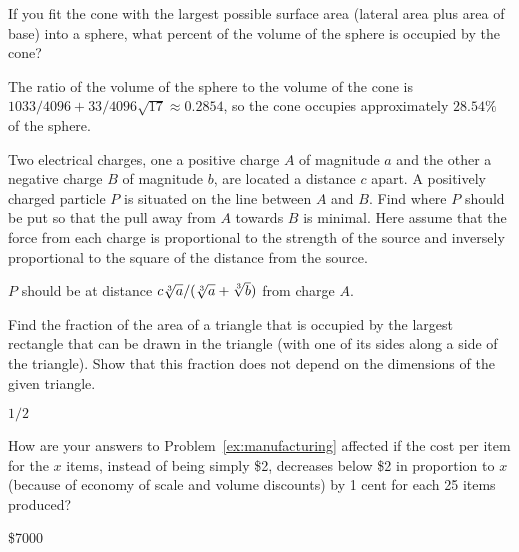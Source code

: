 \begin{exercises}
\begin{exercise}
If you fit the cone with the largest possible surface area (lateral area
plus area of base) into a sphere, what percent of the volume of the
sphere is occupied by the cone?  
\begin{answer} The ratio of the volume of the sphere to the volume of the
cone is $1033/4096+33/4096\sqrt{17}\approx 0.2854$, so the cone
occupies approximately $28.54\%$ of the sphere.
\end{answer}\end{exercise}

\begin{exercise}
Two electrical charges, one a positive charge $A$ of magnitude $a$ and the
other a negative charge $B$ of magnitude $b$, are located a distance $c$
apart.  A positively charged particle $P$ is situated on the line between $A$
and $B$.  Find where $P$ should be put so that the pull away from $A$ towards
$B$ is minimal.  Here assume that the force from each charge is
proportional to the strength of the source and inversely proportional to
the square of the distance from the source.
\begin{answer} $P$ should be at distance $c\root 3\of {a} /
(\root 3\of {a} + \root 3\of {b})$ from charge $A$.
\end{answer}\end{exercise}

\begin{exercise}
Find the fraction of the area of a triangle that is occupied by the largest
rectangle that can be drawn in the triangle (with one of its sides along a
side of the triangle).  Show that this fraction does not depend on the
dimensions of the given triangle.
\begin{answer} $1/2$
\end{answer}\end{exercise}

\begin{exercise}
How are your answers to Problem~\ref{ex:manufacturing} affected if
the cost per item for the $x$ items, instead of being simply \$2,
decreases below \$2 in proportion to $x$ (because of economy of scale
and volume discounts) by 1 cent for each 25 items produced?
\begin{answer} \$7000
\end{answer}\end{exercise}


\end{exercises}

